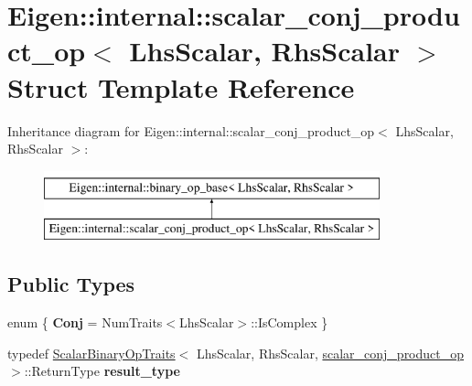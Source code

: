 \hypertarget{struct_eigen_1_1internal_1_1scalar__conj__product__op}{}\section{Eigen\+::internal\+::scalar\+\_\+conj\+\_\+product\+\_\+op$<$ Lhs\+Scalar, Rhs\+Scalar $>$ Struct Template Reference}
\label{struct_eigen_1_1internal_1_1scalar__conj__product__op}
Inheritance diagram for Eigen\+::internal\+::scalar\+\_\+conj\+\_\+product\+\_\+op$<$ Lhs\+Scalar, Rhs\+Scalar $>$\+:\begin{figure}[H]
\begin{center}
\leavevmode
\includegraphics[height=2.000000cm]{struct_eigen_1_1internal_1_1scalar__conj__product__op}
\end{center}
\end{figure}
\subsection*{Public Types}
\begin{DoxyCompactItemize}
\item 
\mbox{\label{struct_eigen_1_1internal_1_1scalar__conj__product__op_aab4f98c72611937f3795f716cbb4cc63}} 
enum \{ {\bfseries Conj} = Num\+Traits$<$Lhs\+Scalar$>$\+::Is\+Complex
 \}
\item 
\mbox{\label{struct_eigen_1_1internal_1_1scalar__conj__product__op_a123d7697ac23673cd7d4f1645dd6dd17}} 
typedef \mbox{\hyperlink{struct_eigen_1_1_scalar_binary_op_traits}{Scalar\+Binary\+Op\+Traits}}$<$ Lhs\+Scalar, Rhs\+Scalar, \mbox{\hyperlink{struct_eigen_1_1internal_1_1scalar__conj__product__op}{scalar\+\_\+conj\+\_\+product\+\_\+op}} $>$\+::Return\+Type {\bfseries result\+\_\+type}
\end{DoxyCompactItemize}
